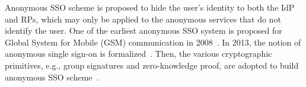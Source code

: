 

Anonymous SSO scheme is proposed to hide the user's identity to both the IdP and RPs, which may only be applied to the anonymous services that do not identify the user.
One of the earliest anonymous SSO system is proposed for Global System for Mobile (GSM) communication in 2008~\cite{ElmuftiWRR08}.
In 2013, the notion of anonymous single sign-on is formalized~\cite{WangWS13}.
Then, the various cryptographic primitives, e.g., group signatures and zero-knowledge proof, are adopted to build anonymous SSO scheme~\cite{WangWS13,HanCSTW18}.

